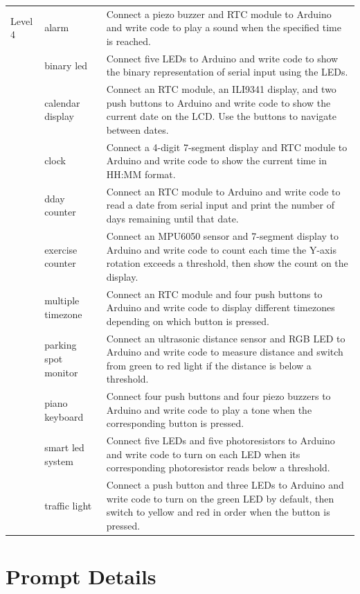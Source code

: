 \documentclass{article} %
\begin{document}
\begin{longtable}{@{}p{1.5cm}p{4cm}p{8.5cm}@{}}
Level 4 & alarm & Connect a piezo buzzer and RTC module to Arduino and write code to play a sound when the specified time is reached. \\
& binary led & Connect five LEDs to Arduino and write code to show the binary representation of serial input using the LEDs. \\
& calendar display & Connect an RTC module, an ILI9341 display, and two push buttons to Arduino and write code to show the current date on the LCD. Use the buttons to navigate between dates. \\
& clock & Connect a 4-digit 7-segment display and RTC module to Arduino and write code to show the current time in HH:MM format. \\
& dday counter & Connect an RTC module to Arduino and write code to read a date from serial input and print the number of days remaining until that date. \\
& exercise counter & Connect an MPU6050 sensor and 7-segment display to Arduino and write code to count each time the Y-axis rotation exceeds a threshold, then show the count on the display. \\
& multiple timezone & Connect an RTC module and four push buttons to Arduino and write code to display different timezones depending on which button is pressed. \\
& parking spot monitor & Connect an ultrasonic distance sensor and RGB LED to Arduino and write code to measure distance and switch from green to red light if the distance is below a threshold. \\
& piano keyboard & Connect four push buttons and four piezo buzzers to Arduino and write code to play a tone when the corresponding button is pressed. \\
& smart led system & Connect five LEDs and five photoresistors to Arduino and write code to turn on each LED when its corresponding photoresistor reads below a threshold. \\
& traffic light & Connect a push button and three LEDs to Arduino and write code to turn on the green LED by default, then switch to yellow and red in order when the button is pressed. \\

\end{longtable}

\section{Prompt Details}
\label{Appendix:Prompts}
\end{document}
